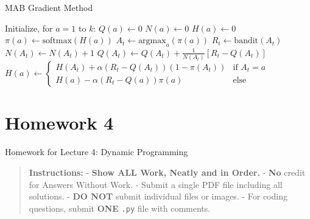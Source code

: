 \documentclass[
  letterpaper,
  DIV=11,
  numbers=noendperiod]{scrreprt}
\makeatletter
\newcommand*\pandocbounded[1]{%
  \sbox\pandoc@box{#1}%
  \Gscale@div\@tempa{\textheight}{\dimexpr\ht\pandoc@box+\dp\pandoc@box\relax}%
  \Gscale@div\@tempb{\linewidth}{\wd\pandoc@box}%
  \ifdim\@tempb\p@<\@tempa\p@\let\@tempa\@tempb\fi%
  \ifdim\@tempa\p@<\p@\scalebox{\@tempa}{\usebox\pandoc@box}%
  \else\usebox{\pandoc@box}%
  \fi%
}
\makeatother
\begin{document}
\begin{algorithm}[htb!]
\caption{MAB Gradient Method}
\begin{algorithmic}[1]
\State Initialize, for $a = 1$ to $k$:
\State $Q(a) \gets 0$
\State $N(a) \gets 0$
\State $H(a) \gets 0$ \\
\State $\pi(a) \gets \text{softmax}(H(a))$
\State $A_t \gets \text{argmax}_a(\pi(a))$
\State $R_t \gets \text{bandit}(A_t)$
\State $N(A_t) \gets N(A_t) + 1$
\State $Q(A_t) \gets Q(A_t) + \frac{1}{N(A_t)}[R_t - Q(A_t)]$
\State $H(a) \gets
    \begin{cases}
        H(A_t) + \alpha (R_t - Q(A_t)) (1 - \pi(A_t)) & \text{if } A_t = a\\
        H(a) - \alpha (R_t - Q(a)) \pi(a) & \text{else}
    \end{cases}$
\Endfor
\end{algorithmic}
\end{algorithm}

\section{\texorpdfstring{\href{https://colab.research.google.com/drive/1B9ko8fJaSFJRbbK493zTUCjI-uBFGla7\#scrollTo=sp5yXpnFeSrp}{\protect\pandocbounded{}}}{}}\label{section-1}

\chapter{Homework 4}\label{homework-4}

\begin{tcolorbox}[enhanced jigsaw, colback=white, left=2mm, breakable, opacityback=0, bottomrule=.15mm, rightrule=.15mm, arc=.35mm, colframe=quarto-callout-note-color-frame, leftrule=.75mm, toprule=.15mm]

Homework for Lecture 4: Dynamic Programming 📝

\end{tcolorbox}

\begin{quote}
\textbf{Instructions:} - \textbf{Show ALL Work, Neatly and in Order.} -
\textbf{No} credit for Answers Without Work. - Submit a single PDF file
including all solutions. - \textbf{DO NOT} submit individual files or
images. - For coding questions, submit \textbf{ONE} \texttt{.py} file
with comments.
\end{quote}
\end{document}
